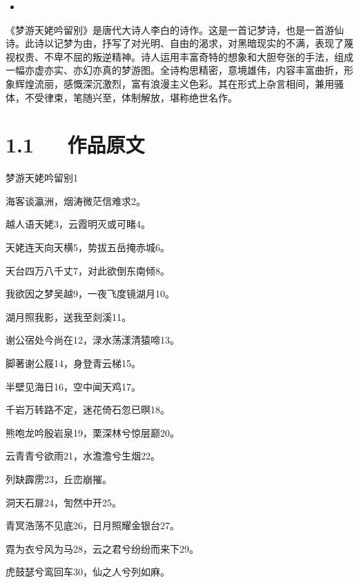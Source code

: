 \documentclass[letterpaper,10pt,english]{sphinxmanual}
\begin{document}
\begin{sphinxShadowBox}
\begin{itemize}
\begin{itemize}
\item {} 
\label{\detokenize{p01_u6563_u6587/_u674e_u767d-_u68a6_u6e38_u5929_u59e5_u541f_u7559_u522b:id17}}{\hyperref[\detokenize{p01_u6563_u6587/_u674e_u767d-_u68a6_u6e38_u5929_u59e5_u541f_u7559_u522b:id9}]{}}

\end{itemize}

\end{itemize}
\end{sphinxShadowBox}

《梦游天姥吟留别》是唐代大诗人李白的诗作。这是一首记梦诗，也是一首游仙诗。此诗以记梦为由，抒写了对光明、自由的渴求，对黑暗现实的不满，表现了蔑视权贵、不卑不屈的叛逆精神。诗人运用丰富奇特的想象和大胆夸张的手法，组成一幅亦虚亦实、亦幻亦真的梦游图。全诗构思精密，意境雄伟，内容丰富曲折，形象辉煌流丽，感慨深沉激烈，富有浪漫主义色彩。其在形式上杂言相间，兼用骚体，不受律束，笔随兴至，体制解放，堪称绝世名作。


\section{1.1   作品原文}
\label{\detokenize{p01_u6563_u6587/_u674e_u767d-_u68a6_u6e38_u5929_u59e5_u541f_u7559_u522b:id3}}
梦游天姥吟留别1

海客谈瀛洲，烟涛微茫信难求2。

越人语天姥3，云霞明灭或可睹4。

天姥连天向天横5，势拔五岳掩赤城6。

天台四万八千丈7，对此欲倒东南倾8。

我欲因之梦吴越9，一夜飞度镜湖月10。

湖月照我影，送我至剡溪11。

谢公宿处今尚在12，渌水荡漾清猿啼13。

脚著谢公屐14，身登青云梯15。

半壁见海日16，空中闻天鸡17。

千岩万转路不定，迷花倚石忽已暝18。

熊咆龙吟殷岩泉19，栗深林兮惊层巅20。

云青青兮欲雨21，水澹澹兮生烟22。

列缺霹雳23，丘峦崩摧。

洞天石扉24，訇然中开25。

青冥浩荡不见底26，日月照耀金银台27。

霓为衣兮风为马28，云之君兮纷纷而来下29。

虎鼓瑟兮鸾回车30，仙之人兮列如麻。
\end{document}
